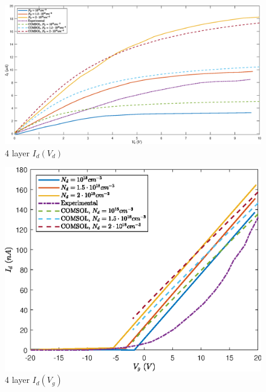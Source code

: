 \documentclass[12pt,a4paper,titlepage]{article}
\begin{document}
\begin{figure}[H]
	\centering
	\includegraphics[width=1\textwidth]{Grafici/4layer_Id(Vd).eps} 
	\caption{4 layer $I_d(V_d)$}
	\label{fig:4layer_Id(Vd)}
\end{figure}

\begin{figure}[H]
	\centering
	\includegraphics[width=.8\textwidth]{Grafici/4layer_Id(Vg).eps} 
	\caption{4 layer $I_d(V_g)$}
	\label{fig:4layer_Id(Vg)}
\end{figure}

\newpage
\end{document}
